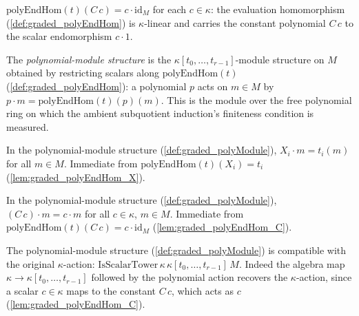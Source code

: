 \begin{lemma}
  \label{lem:graded_polyEndHom_C}
  \(\mathrm{polyEndHom}(t)(C\,c) = c \cdot \mathrm{id}_M\) for each \(c \in \kappa\):
  the evaluation homomorphism (\cref{def:graded_polyEndHom}) is \(\kappa\)-linear and
  carries the constant polynomial \(C\,c\) to the scalar endomorphism \(c \cdot 1\).
\end{lemma}

\begin{definition}
  \label{def:graded_polyModule}
  The \emph{polynomial-module structure} is the \(\kappa[t_0, \dots, t_{r-1}]\)-module
  structure on \(M\) obtained by restricting scalars along
  \(\mathrm{polyEndHom}(t)\) (\cref{def:graded_polyEndHom}): a polynomial \(p\) acts on
  \(m \in M\) by \(p \cdot m = \mathrm{polyEndHom}(t)(p)(m)\). This is the module over the
  free polynomial ring on which the ambient subquotient induction's finiteness condition
  is measured.
\end{definition}

\begin{lemma}\leanok
[$X_i$ acts as $t_i$]
  \label{lem:graded_polyModule_X_smul}
  In the polynomial-module structure (\cref{def:graded_polyModule}), \(X_i \cdot m =
  t_i(m)\) for all \(m \in M\). Immediate from
  \(\mathrm{polyEndHom}(t)(X_i) = t_i\) (\cref{lem:graded_polyEndHom_X}).
\end{lemma}

\begin{lemma}
  \label{lem:graded_polyModule_C_smul}
  In the polynomial-module structure (\cref{def:graded_polyModule}), \((C\,c) \cdot m =
  c \cdot m\) for all \(c \in \kappa\), \(m \in M\). Immediate from
  \(\mathrm{polyEndHom}(t)(C\,c) = c \cdot \mathrm{id}_M\)
  (\cref{lem:graded_polyEndHom_C}).
\end{lemma}

\begin{lemma}
  \label{lem:graded_polyModule_isScalarTower}
  The polynomial-module structure (\cref{def:graded_polyModule}) is compatible with the
  original \(\kappa\)-action: \(\mathrm{IsScalarTower}\,\kappa\,\kappa[t_0, \dots,
  t_{r-1}]\,M\). Indeed the algebra map \(\kappa \to \kappa[t_0, \dots, t_{r-1}]\)
  followed by the polynomial action recovers the \(\kappa\)-action, since a scalar
  \(c \in \kappa\) maps to the constant \(C\,c\), which acts as \(c\)
  (\cref{lem:graded_polyEndHom_C}).
\end{lemma}

